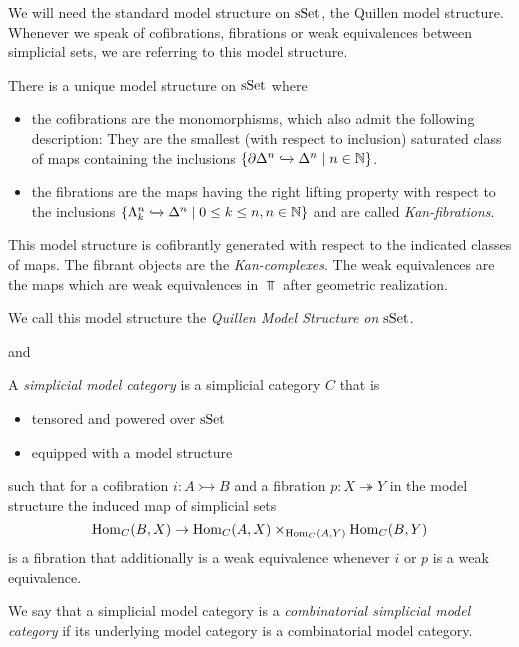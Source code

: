 We will need the standard model structure on $\operatorname{sSet}$, the Quillen model structure. 
Whenever we speak of cofibrations, fibrations or weak equivalences between simplicial sets, we are referring to this model structure.
\begin{thm}
    There is a unique model structure on $\operatorname{sSet}$ where 
    \begin{itemize}
        \item the cofibrations are the monomorphisms, which also admit the following description: 
        They are the smallest (with respect to inclusion) saturated class of maps containing the inclusions $\left\lbrace\partial\Delta^n\xhookrightarrow{}\Delta^n\mid n\in\mathbb{N}\right\rbrace$.
        \item the fibrations are the maps having the right lifting property with respect to the inclusions $\left\lbrace\Lambda_k^n\xhookrightarrow{}\Delta^n\mid 0\leq k\leq n, n\in\mathbb{N}\right\rbrace$ and are called \emph{Kan-fibrations}.
    \end{itemize}
    This model structure is cofibrantly generated with respect to the indicated classes of maps.
    The fibrant objects are the \emph{Kan-complexes}.
    The weak equivalences are the maps which are weak equivalences in $\Top$ after geometric realization.

    We call this model structure the \emph{Quillen Model Structure on $\operatorname{sSet}$}.
    \begin{reference}
        \cite[Theorem 3.1.8 and Theorem 3.1.29]{cisinski_2019} and \cite[Chap. II, \S 3, Theorem 1]{Quillen1967}
    \end{reference}
\end{thm}
\begin{definition}
    A \emph{simplicial model category} is a simplicial category $C$ that is 
    \begin{itemize}
        \item tensored and powered over $\operatorname{sSet}$
        \item equipped with a model structure
    \end{itemize} 
    such that for a cofibration $i:A\rightarrowtail B$ and a fibration $p:X\twoheadrightarrow Y$ in the model structure the induced map of simplicial sets
    \begin{equation*}
        \operatorname{Hom}_C(B,X)\to\operatorname{Hom}_C(A,X)\times_{\operatorname{Hom}_C(A,Y)}\operatorname{Hom}_C(B,Y)
    \end{equation*}
    is a fibration that additionally is a weak equivalence whenever $i$ or $p$ is a weak equivalence.
    
    We say that a simplicial model category is a \emph{combinatorial simplicial model category} if its underlying model category is a combinatorial model category.
\end{definition}
